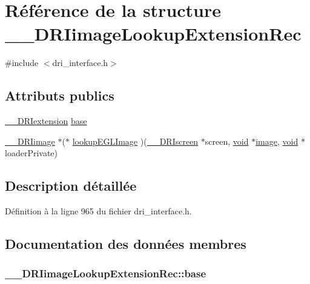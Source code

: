 \hypertarget{struct_____d_r_iimage_lookup_extension_rec}{\section{Référence de la structure \-\_\-\-\_\-\-D\-R\-Iimage\-Lookup\-Extension\-Rec}
\label{struct_____d_r_iimage_lookup_extension_rec}
}


{\ttfamily \#include $<$dri\-\_\-interface.\-h$>$}

\subsection*{Attributs publics}
\begin{DoxyCompactItemize}
\item 
\hyperlink{dri__interface_8h_a4e0a61c8ece00d2b2c6792a9a1b55385}{\-\_\-\-\_\-\-D\-R\-Iextension} \hyperlink{struct_____d_r_iimage_lookup_extension_rec_a5e2d2e1c2d65d01580035430431847a7}{base}
\item 
\hyperlink{dri__interface_8h_a37e0407153595dc88fe5d25127645cf1}{\-\_\-\-\_\-\-D\-R\-Iimage} $\ast$($\ast$ \hyperlink{struct_____d_r_iimage_lookup_extension_rec_a58a76edd8dcd2f9b1801af1dd9bec284}{lookup\-E\-G\-L\-Image} )(\hyperlink{dri__interface_8h_a9961b01d421ee1fd6ed3c05acc9ca561}{\-\_\-\-\_\-\-D\-R\-Iscreen} $\ast$screen, \hyperlink{glu_8h_a4292190e3f1f6b373a760c7d9316ad3c}{void} $\ast$\hyperlink{gl_8h_a4f252db605f5b9117603096756e79824}{image}, \hyperlink{glu_8h_a4292190e3f1f6b373a760c7d9316ad3c}{void} $\ast$loader\-Private)
\end{DoxyCompactItemize}


\subsection{Description détaillée}


Définition à la ligne 965 du fichier dri\-\_\-interface.\-h.



\subsection{Documentation des données membres}
\hypertarget{struct_____d_r_iimage_lookup_extension_rec_a5e2d2e1c2d65d01580035430431847a7}{
\subsubsection[{base}]{ \-\_\-\-\_\-\-D\-R\-Iimage\-Lookup\-Extension\-Rec\-::base}}\label{struct_____d_r_iimage_lookup_extension_rec_a5e2d2e1c2d65d01580035430431847a7}


